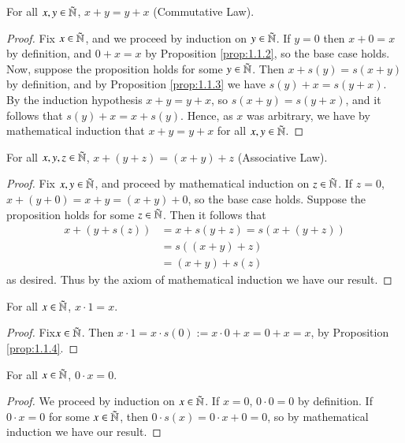\begin{prop}\label{prop:1.1.4}
    For all $x, y \in \tilde{\mathbb N}$, $x+y = y+x$ (Commutative Law).
\end{prop}
\begin{proof}
    Fix $x \in \tilde{\mathbb N}$, and we proceed by induction on $y \in \tilde{\mathbb N}$. If $y = 0$ then $x+0 = x$ by definition, and $0+x = x$ by Proposition \ref{prop:1.1.2}, so the base case holds. Now, suppose the proposition holds for some $y \in \tilde{\mathbb N}$. Then $x+s(y) = s(x+y)$ by definition, and by Proposition \ref{prop:1.1.3} we have $s(y)+x = s(y+x)$. By the induction hypothesis $x+y = y+x$, so $s(x+y) = s(y+x)$, and it follows that $s(y)+x = x+s(y)$. Hence, as $x$ was arbitrary, we have by mathematical induction that $x+y = y+x$ for all $x,y \in \tilde{\mathbb N}$.
\end{proof}

\begin{prop}\label{prop:1.1.5}
    For all $x,y,z \in \tilde{\mathbb N}$, $x+(y+z) = (x+y)+z$ (Associative Law).
\end{prop}
\begin{proof}
    Fix $x,y \in \tilde{\mathbb N}$, and proceed by mathematical induction on $z \in \tilde{\mathbb N}$. If $z = 0$, $x+(y+0) = x+y = (x+y)+0$, so the base case holds. Suppose the proposition holds for some $z \in \tilde{\mathbb N}$. Then it follows that \begin{align*}
        x+(y+s(z)) &= x + s(y+z) = s(x+(y+z)) \\
        &= s((x+y)+z) \tag{by Induction Hypothesis} \\
        &= (x+y)+s(z)
    \end{align*}
    as desired. Thus by the axiom of mathematical induction we have our result.
\end{proof}

\begin{prop}\label{prop:1.1.6}
    For all $x \in \tilde{\mathbb N}$, $x\cdot 1 = x$.
\end{prop}
\begin{proof}
    Fix$ x \in \tilde{\mathbb N}$. Then $x\cdot 1 = x\cdot s(0) := x\cdot 0 + x = 0 + x = x$, by Proposition \ref{prop:1.1.4}.
\end{proof}

\begin{prop}\label{prop:1.1.7}
    For all $x \in \tilde{\mathbb N}$, $0\cdot x = 0$.
\end{prop}
\begin{proof}
    We proceed by induction on $x \in \tilde{\mathbb N}$. If $x = 0$, $0\cdot 0 = 0$ by definition. If $0\cdot x = 0$ for some $x \in \tilde{\mathbb N}$, then $0 \cdot s(x) = 0\cdot x + 0 = 0$, so by mathematical induction we have our result.
\end{proof}

